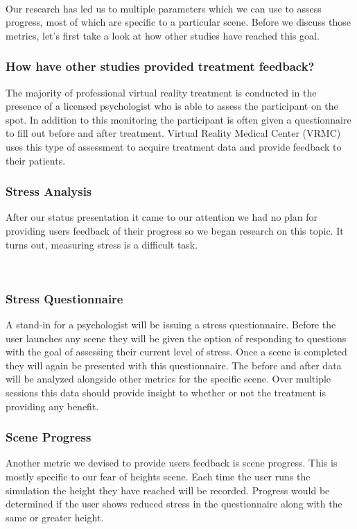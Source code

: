 \documentclass[a4paper,10pt]{article}
\begin{document}
\par~\\ 
Our research has led us to multiple parameters which we can use to assess progress, most of which are specific to a particular scene. Before we discuss those metrics, 
let's first take a look at how other studies have reached this goal.

\subsubsection{How have other studies provided treatment feedback?}
The majority of professional virtual reality treatment is conducted in the presence of a licensed psychologist who is able to assess the participant on the spot. In addition 
to this monitoring the participant is often given a questionnaire to fill out before and after treatment. Virtual Reality Medical Center (VRMC) uses this type of assessment to 
acquire treatment data and provide feedback to their patients. \cite{vrPhobia}

\subsubsection{Stress Analysis}
After our status presentation it came to our attention we had no plan for providing users feedback of their progress so we began research on this topic.
It turns out, measuring stress is a difficult task. 
\par~\\

\subsubsection{Stress Questionnaire}
A stand-in for a psychologist will be issuing a stress questionnaire. Before the user launches any scene they will be given the option of responding to questions
with the goal of assessing their current level of stress. Once a scene is completed they will again be presented with this questionnaire. The before and after data will be 
analyzed alongside other metrics for the specific scene. Over multiple sessions this data should provide insight to whether or not the treatment is providing any benefit.

\subsubsection{Scene Progress}
Another metric we devised to provide users feedback is scene progress. This is mostly specific to our fear of heights scene. Each time the user runs the simulation 
the height they have reached will be recorded. Progress would be determined if the user shows reduced stress in the questionnaire along with the same or greater height.
\end{document}
